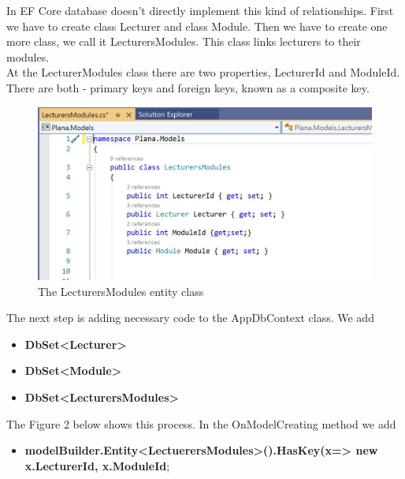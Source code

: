 \documentclass{scrartcl}
\begin{document}
In EF Core database doesn't directly implement this kind of relationships.
First we have to create class Lecturer and class Module. Then we have to create one more class, we call it LecturersModules. This class links lecturers to their modules. \\
At the LecturerModules class there are two properties, LecturerId and ModuleId. There are both - primary keys and foreign keys, known as a composite key.\cite{efa}


\begin{figure}[H]
\centering
\includegraphics[width=150mm]{report_img/lecturers-modules.JPG}
\caption{The LecturersModules entity class}
\label{blabla}
\end{figure}

 The next step  is adding necessary code to the AppDbContext class. We add 
 \begin{itemize}
 \item \textbf{DbSet<Lecturer>} 
 \item \textbf {DbSet<Module>}
 \item \textbf{DbSet<LecturersModules>}
 \end{itemize}
 
 
 
The Figure 2 below shows this process. In the OnModelCreating method we add
\begin{itemize}
\item\textbf{modelBuilder.Entity<LectuerersModules>().HasKey(x=> new {x.LecturerId, x.ModuleId}};
\end{itemize}


 
\end{document}
